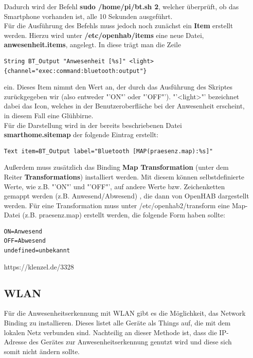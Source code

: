 Dadurch wird der Befehl \textbf{sudo /home/pi/bt.sh 2}, welcher überprüft, ob das Smartphone vorhanden ist, alle 10 Sekunden ausgeführt.\\
Für die Ausführung des Befehls muss jedoch noch zunächst ein \textbf{Item} erstellt werden. Hierzu wird unter \textbf{/etc/openhab/items} eine neue Datei, \textbf{anwesenheit.items}, angelegt. 
In diese trägt man die Zeile 
\begin{lstlisting}
String BT_Output "Anwesenheit [%s]" <light> {channel="exec:command:bluetooth:output"}
\end{lstlisting} ein. Dieses Item nimmt den Wert an, der durch das Ausführung des Skriptes zurückgegeben wir (also entweder "'ON"' oder "'OFF"'). "'<light>"' bezeichnet dabei das Icon, welches in der Benutzeroberfläche bei der Anwesenheit erscheint, in diesem Fall eine Glühbirne. \\


Für die Darstellung wird in der bereits beschriebenen Datei \textbf{smarthome.sitemap} der folgende Eintrag erstellt: 
\begin{lstlisting}
Text item=BT_Output label="Bluetooth [MAP(praesenz.map):%s]"
\end{lstlisting}
Außerdem muss zusätzlich das Binding \textbf{Map Transformation} (unter dem Reiter \textbf{Transformations}) installiert werden. Mit diesem können selbstdefinierte Werte, wie z.B. "'ON"' und "'OFF"', auf andere Werte bzw. Zeichenketten gemappt werden (z.B. Anwesend/Abwesend) , die dann von OpenHAB dargestellt werden. Für eine Transformation muss unter /etc/openhab2/transform eine Map-Datei (z.B. praesenz.map) erstellt werden, die folgende Form haben sollte:

\begin{lstlisting}
ON=Anwesend
OFF=Abwesend
undefined=unbekannt
\end{lstlisting}


https://klenzel.de/3328

\subsection{WLAN}
Für die Anwesenheitserkennung mit WLAN gibt es die Möglichkeit, das Network Binding zu installieren. Dieses listet alle Geräte als Things auf, die mit dem lokalen Netz verbunden sind. Nachteilig an dieser Methode ist, dass die IP-Adresse des Gerätes zur Anwesenheitserkennung genutzt wird und diese sich somit nicht ändern sollte.

